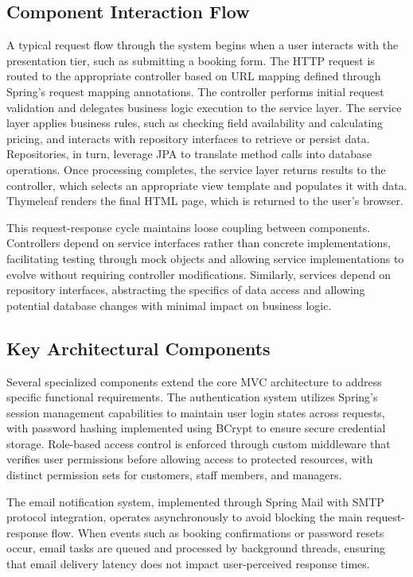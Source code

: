 \subsection{Component Interaction Flow}

A typical request flow through the system begins when a user interacts with the presentation tier, such as submitting a booking form. The HTTP request is routed to the appropriate controller based on URL mapping defined through Spring's request mapping annotations. The controller performs initial request validation and delegates business logic execution to the service layer. The service layer applies business rules, such as checking field availability and calculating pricing, and interacts with repository interfaces to retrieve or persist data. Repositories, in turn, leverage JPA to translate method calls into database operations. Once processing completes, the service layer returns results to the controller, which selects an appropriate view template and populates it with data. Thymeleaf renders the final HTML page, which is returned to the user's browser.

This request-response cycle maintains loose coupling between components. Controllers depend on service interfaces rather than concrete implementations, facilitating testing through mock objects and allowing service implementations to evolve without requiring controller modifications. Similarly, services depend on repository interfaces, abstracting the specifics of data access and allowing potential database changes with minimal impact on business logic.

\subsection{Key Architectural Components}

Several specialized components extend the core MVC architecture to address specific functional requirements. The authentication system utilizes Spring's session management capabilities to maintain user login states across requests, with password hashing implemented using BCrypt to ensure secure credential storage. Role-based access control is enforced through custom middleware that verifies user permissions before allowing access to protected resources, with distinct permission sets for customers, staff members, and managers.

The email notification system, implemented through Spring Mail with SMTP protocol integration, operates asynchronously to avoid blocking the main request-response flow. When events such as booking confirmations or password resets occur, email tasks are queued and processed by background threads, ensuring that email delivery latency does not impact user-perceived response times.

